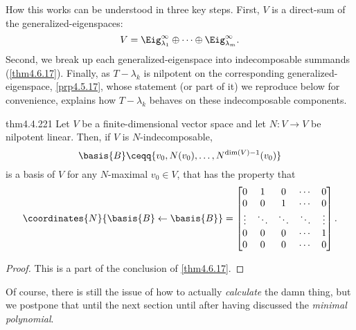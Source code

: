 How this works can be understood in three key steps.  First, $V$ is a direct-sum of the generalized-eigenspaces:
\begin{equation}
	V=\Eig _{\lambda _1}^{\infty}\oplus \cdots \oplus \Eig _{\lambda _m}^{\infty}.
\end{equation}
Second, we break up each generalized-eigenspace into indecomposable summands (\cref{thm4.6.17}).  Finally, as $T-\lambda _k$ is nilpotent on the corresponding generalized-eigenspace, \cref{prp4.5.17}, whose statement (or part of it) we reproduce below for convenience, explains how $T-\lambda _k$ behaves on these indecomposable components.
\begin{thm}{}{thm4.4.221}
	Let $V$ be a finite-dimensional vector space and let $N\colon V\rightarrow V$ be nilpotent linear.  Then, if $V$ is $N$-indecomposable,
	\begin{equation}
		\basis{B}\ceqq \{ v_0,N(v_0),\ldots ,N^{\dim (V)-1}(v_0)\}
	\end{equation}
	is a basis of $V$ for any $N$-maximal $v_0\in V$, that has the property that
	\begin{equation}
		\coordinates{N}{\basis{B}\leftarrow \basis{B}}=\begin{bmatrix}0 & 1 & 0 & \cdots & 0 \\ 0 & 0 & 1 & \cdots & 0 \\ \vdots &\ddots & \ddots & \ddots & \vdots \\ 0 & 0 & 0 & \cdots & 1 \\ 0 & 0 & 0 & \cdots & 0\end{bmatrix}.
	\end{equation}
	\begin{proof}
		This is a part of the conclusion of \cref{thm4.6.17}.
	\end{proof}
\end{thm}
Of course, there is still the issue of how to actually \emph{calculate} the damn thing, but we postpone that until the next section until after having discussed the \emph{minimal polynomial}.

